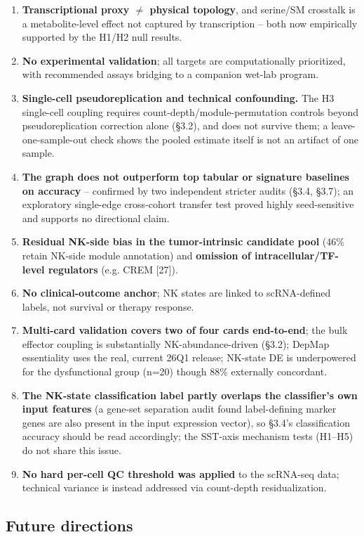 \documentclass[modern,large,numbered,nocrop]{oup-authoring-template}
\begin{document}
\begin{enumerate}
\item \textbf{Transcriptional proxy $\neq$ physical topology}, and serine/SM crosstalk is a metabolite-level effect not captured by transcription -- both now empirically supported by the H1/H2 null results.
\item \textbf{No experimental validation}; all targets are computationally prioritized, with recommended assays bridging to a companion wet-lab program.
\item \textbf{Single-cell pseudoreplication and technical confounding.} The H3 single-cell coupling requires count-depth/module-permutation controls beyond pseudoreplication correction alone (\S{}3.2), and does not survive them; a leave-one-sample-out check shows the pooled estimate itself is not an artifact of one sample.
\item \textbf{The graph does not outperform top tabular or signature baselines on accuracy} -- confirmed by two independent stricter audits (\S{}3.4, \S{}3.7); an exploratory single-edge cross-cohort transfer test proved highly seed-sensitive and supports no directional claim.
\item \textbf{Residual NK-side bias in the tumor-intrinsic candidate pool} (46\% retain NK-side module annotation) and \textbf{omission of intracellular/TF-level regulators} (e.g. CREM [27]).
\item \textbf{No clinical-outcome anchor}; NK states are linked to scRNA-defined labels, not survival or therapy response.
\item \textbf{Multi-card validation covers two of four cards end-to-end}; the bulk effector coupling is substantially NK-abundance-driven (\S{}3.2); DepMap essentiality uses the real, current 26Q1 release; NK-state DE is underpowered for the dysfunctional group (n=20) though 88\% externally concordant.
\item \textbf{The NK-state classification label partly overlaps the classifier's own input features} (a gene-set separation audit found label-defining marker genes are also present in the input expression vector), so \S{}3.4's classification accuracy should be read accordingly; the SST-axis mechanism tests (H1--H5) do not share this issue.
\item \textbf{No hard per-cell QC threshold was applied} to the scRNA-seq data; technical variance is instead addressed via count-depth residualization.
\end{enumerate}

\subsection{Future directions}
\end{document}
